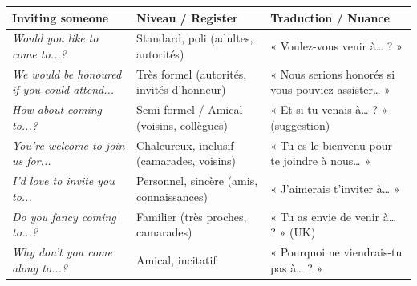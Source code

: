 \documentclass[11pt]{article}
\newcommand{\eng}[1]{\ifmmode\text{\textit{#1}}\else\begingroup\selectlanguage{english}\itshape #1\endgroup\fi}
\begin{document}
\begin{center}
\begin{tabularx}{\linewidth}{|X|X|X|}
\hline
\rowcolor{popblueL} \textbf{Inviting someone} & \textbf{Niveau / Register} & \textbf{Traduction / Nuance} \\
\hline
\eng{Would you like to come to...?} & Standard, poli (adultes, autorités) & « Voulez-vous venir à… ? » \\
\eng{We would be honoured if you could attend...} & Très formel (autorités, invités d’honneur) & « Nous serions honorés si vous pouviez assister… » \\
\eng{How about coming to...?} & Semi-formel / Amical (voisins, collègues) & « Et si tu venais à… ? » (suggestion) \\
\eng{You’re welcome to join us for...} & Chaleureux, inclusif (camarades, voisins) & « Tu es le bienvenu pour te joindre à nous… » \\
\eng{I’d love to invite you to...} & Personnel, sincère (amis, connaissances) & « J’aimerais t’inviter à… » \\
\eng{Do you fancy coming to...?} & Familier (très proches, camarades) & « Tu as envie de venir à… ? » (UK) \\
\eng{Why don’t you come along to...?} & Amical, incitatif & « Pourquoi ne viendrais-tu pas à… ? » \\
\hline
\end{tabularx}
\end{center}
\end{document}
